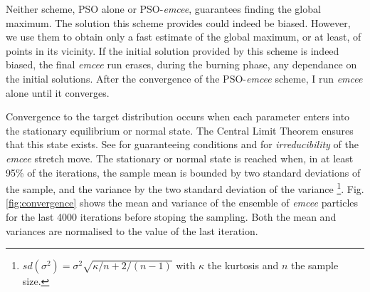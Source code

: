 Neither scheme, PSO alone or PSO-\emph{emcee}, guarantees finding the global maximum. The solution this scheme provides could indeed be biased. However, we use them to obtain only a fast estimate of the global maximum, or at least, of points in its vicinity. If the initial solution provided by this scheme is indeed biased, the final \emph{emcee} run erases, during the burning phase, any dependance on the initial solutions. After the convergence of the PSO-\emph{emcee} scheme, I run \emph{emcee} alone until it converges.  
 
Convergence to the target distribution occurs when each parameter enters into the stationary equilibrium or normal state. The Central Limit Theorem ensures that this state exists. See \citet{Roberts2004} for guaranteeing conditions and \citet{Goodman2010} for \emph{irreducibility} of the \emph{emcee} stretch move. The stationary or normal state is reached when, in at least 95\% of the iterations, the sample mean is bounded by two standard deviations of the sample, and the variance by the two standard deviation of the variance \footnote{
$sd(\sigma^2)=\sigma^2 \sqrt{\kappa/n + 2/(n-1)}$ with $\kappa$ the kurtosis and $n$ the sample size.
}. Fig. \ref{fig:convergence} shows the mean and variance of the ensemble of \emph{emcee} particles for the last 4000 iterations before stoping the sampling. Both the mean and variances are normalised to the value of the last iteration.



